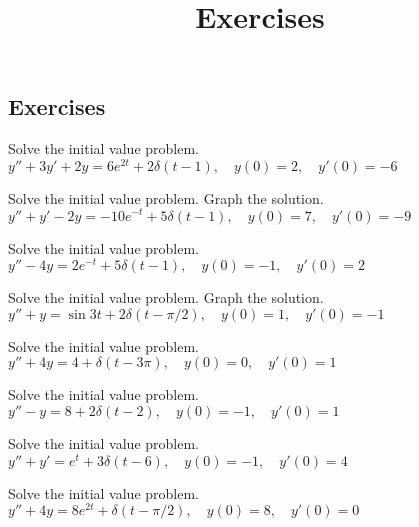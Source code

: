 \documentclass{ximera}
\title{Exercises} \license{CC BY-NC-SA 4.0}
\begin{document}
\begin{abstract}
\end{abstract}
\maketitle

\begin{onlineOnly}
\section*{Exercises}
\end{onlineOnly}

\begin{problem}\label{exer:8.7.1}
Solve the initial value
problem.
 $y''+3y'+2y=6e^{2t}+2\delta(t-1), \quad  y(0)=2,\quad y'(0)=-6$
\end{problem}

\begin{problem}\label{exer:8.7.2} 
Solve the initial value
problem.  Graph the solution.
 $y''+y'-2y=-10e^{-t}+5\delta(t-1), \quad  y(0)=7,\quad y'(0)=-9$
\end{problem}

\begin{problem}\label{exer:8.7.3}
Solve the initial value
problem.
 $y''-4y=2e^{-t}+5\delta(t-1), \quad  y(0)=-1,\quad y'(0)=2$
\end{problem}

\begin{problem}\label{exer:8.7.4}  Solve the initial value problem.  Graph the solution.
 $y''+y=\sin3t+2\delta(t-\pi/2), \quad  y(0)=1,\quad y'(0)=-1$
\end{problem}

\begin{problem}\label{exer:8.7.5} 
Solve the initial value
problem.
 $y''+4y=4+\delta(t-3\pi), \quad  y(0)=0,\quad y'(0)=1$
\end{problem}

\begin{problem}\label{exer:8.7.6}
Solve the initial value
problem.
 $y''-y=8+2\delta(t-2), \quad  y(0)=-1,\quad y'(0)=1$
\end{problem}

\begin{problem}\label{exer:8.7.7}
Solve the initial value
problem.
 $y''+y'=e^t+3\delta(t-6), \quad  y(0)=-1,\quad y'(0)=4$
\end{problem}

\begin{problem}\label{exer:8.7.8}
Solve the initial value
problem.
 $y''+4y=8e^{2t}+\delta(t-\pi/2), \quad  y(0)=8,\quad y'(0)=0$
\end{problem}
\end{document}
